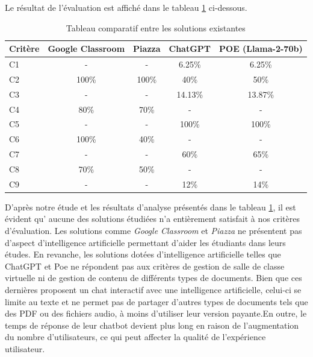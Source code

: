 \vspace{0.5em}
\noindent Le résultat de l’évaluation est affiché dans le tableau \ref{tab:tableau_comparatif} ci-dessous.
\begin{table}[htbp]
    \centering
    \renewcommand{\arraystretch}{1.5}
    \setlength{\tabcolsep}{10pt} 
    \caption{Tableau comparatif entre les solutions existantes}
    \label{tab:tableau_comparatif}
    \begin{tabular}{|l|c|c|c|c|}
      \hline
      \textbf{Critère} & \textbf{Google Classroom} & \textbf{Piazza} & \textbf{ChatGPT} & \textbf{POE (Llama-2-70b)} \\
      \hline
      C1 & - & - & 6.25\% & 6.25\% \\
      \hline
      C2 & 100\% & 100\% & 40\% & 50\% \\
      \hline
      C3 & - & - & 14.13\% & 13.87\% \\
      \hline
      C4 & 80\% & 70\% & - & - \\
      \hline
      C5 & - & - & 100\% & 100\% \\
      \hline
      C6 & 100\% & 40\% & - & - \\
      \hline
      C7 & - & - & 60\% & 65\% \\
      \hline
      C8 & 70\% & 50\% & - & - \\
      \hline
      C9 & - & - & 12\% & 14\% \\
      \hline
    \end{tabular}
\end{table}

\vspace{0.5em}
\noindent D'après notre étude et les résultats d'analyse présentés dans le tableau \ref{tab:tableau_comparatif}, il est évident qu' aucune des solutions étudiées n'a entièrement satisfait à nos critères d'évaluation. Les solutions comme \textit{Google Classroom} et \textit{Piazza} ne présentent pas d'aspect d'intelligence artificielle permettant d'aider les étudiants dans leurs études. En revanche, les solutions dotées d'intelligence artificielle telles que ChatGPT et Poe ne répondent pas aux critères de gestion de salle de classe virtuelle ni de gestion de contenu de différents types de documents. Bien que ces dernières proposent un chat interactif avec une intelligence artificielle, celui-ci se limite au texte et ne permet pas de partager d'autres types de documents tels que des PDF ou des fichiers audio, à moins d'utiliser leur version payante.En outre, le temps de réponse de leur chatbot devient plus long en raison de l’augmentation du nombre d’utilisateurs, ce qui peut affecter la qualité de l’expérience utilisateur.

